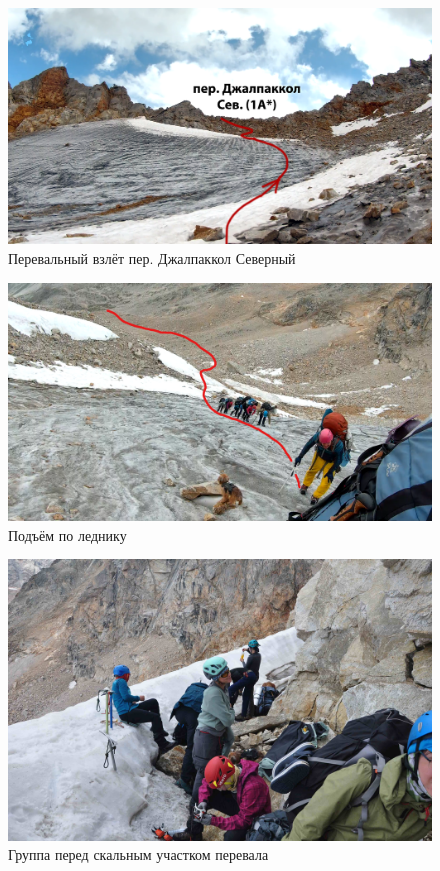 \begin{figure}[h!]
	\centering
	\includegraphics[width=0.7\linewidth]{../pics/dzh_1}
	\caption{Перевальный взлёт пер. Джалпаккол Северный}
	\label{fig:dzh_1}
\end{figure}

\begin{figure}[h!]	
	\centering
	\includegraphics[angle=0, width=0.7\linewidth]{../pics/gopro_dzh}
	\caption{Подъём по леднику}
	\label{fig:gopro_dzh}
\end{figure}

\begin{figure}[h!]	
	\centering
	\includegraphics[angle=0, width=0.7\linewidth]{../pics/DSC_0021}
	\caption{Группа перед скальным участком перевала}
	\label{fig:DSC_0021}
\end{figure}









